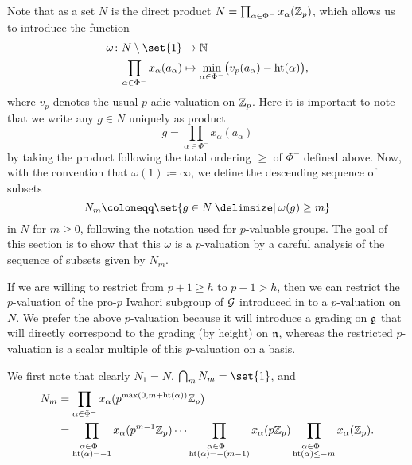 Note that as a set $N$ is the direct product $N = \prod_{\alpha \in \Phi^{-}} x_\alpha(\mathbb{Z}_p)$, which allows us to introduce the function
\begin{equation}\label{eq:p-val}
  \begin{split}
    \omega \colon N \setminus \set{1} &\to \N \\
    \prod_{\alpha \in \Phi^{-}} x_\alpha(a_\alpha) &\mapsto \min_{\alpha \in \Phi^{-}} \bigl( v_p(a_\alpha) - \Ht(\alpha) \bigr),
  \end{split}
\end{equation}
where $v_p$ denotes the usual $p$-adic valuation on $\mathbb{Z}_p$. Here it is important to note that we write any $g \in N$ uniquely as product
\begin{equation*}
  g = \prod_{\alpha \in \Phi^{-}} x_\alpha(a_\alpha)
\end{equation*}
by taking the product following the total ordering $\geq$ of $\Phi^{-}$ defined above. Now, with the convention that $\omega(1) \coloneqq \infty$, we define the descending sequence of subsets
\begin{equation*}
  N_{m} \coloneqq \set{g \in N \given \omega(g) \geq m}
\end{equation*}
in $N$ for $m\geq0$, following the notation used for $p$-valuable groups. The goal of this section is to show that this $\omega$ is a $p$-valuation by a careful analysis of the sequence of subsets given by $N_m$.

\begin{remark}
  If we are willing to restrict from $p+1 \geq h$ to $p-1 > h$, then we can restrict the $p$-valuation of the pro-$p$ Iwahori subgroup of $\mathcal{G}$ introduced in  to a $p$-valuation on $N$. We prefer the above $p$-valuation because it will introduce a grading on $\mathfrak{g}$ that will directly correspond to the grading (by height) on $\mathfrak{n}$, whereas the restricted $p$-valuation is a scalar multiple of this $p$-valuation on a basis.
\end{remark}

We first note that clearly $N_1 = N$, $\bigcap_m N_m = \set{1}$, and
\begin{equation}
  \label{eq:N_m}
  \begin{split}
    N_m &= \prod_{\alpha \in \Phi^{-}} x_\alpha(p^{\max(0,m+\operatorname{ht}(\alpha))} \mathbb{Z}_p) \\
    &= \prod_{\substack{\alpha\in \Phi^{-} \\ \operatorname{ht}(\alpha) = -1}} x_\alpha(p^{m-1} \mathbb{Z}_p) \dotsb \prod_{\substack{\alpha\in \Phi^{-} \\ \operatorname{ht}(\alpha) = -(m-1)}} x_\alpha(p\mathbb{Z}_p) \prod_{\substack{\alpha\in \Phi^{-} \\ \operatorname{ht}(\alpha) \leq -m}} x_\alpha(\mathbb{Z}_p).
  \end{split}
\end{equation}

